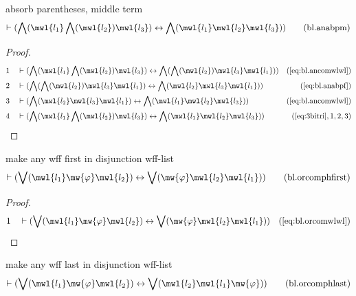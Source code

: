 \begin{lemma} absorb parentheses, middle term
\begin{align}
\vdash ( \bigwedge( \mwl{l_1} \bigwedge( \mwl{l_2} ) \mwl{l_3} )
    \leftrightarrow \bigwedge( \mwl{l_1} \mwl{l_2} \mwl{l_3} )
    )\label{eq:bl.anabpm}\tag{bl.anabpm}
\end{align}
\end{lemma}

\begin{proof}
\begin{align}
  1 &&  & \vdash ( \bigwedge( \mwl{l_1} \bigwedge( \mwl{l_2} ) \mwl{l_3} ) \leftrightarrow \bigwedge( \bigwedge( \mwl{l_2} ) \mwl{l_3} \mwl{l_1} ) )&(\mbox{\ref{eq:bl.ancomwlwl}})\notag
  \\ 2 &&  & \vdash ( \bigwedge( \bigwedge( \mwl{l_2} ) \mwl{l_3} \mwl{l_1} ) \leftrightarrow \bigwedge( \mwl{l_2} \mwl{l_3} \mwl{l_1} ) )&(\mbox{\ref{eq:bl.anabpf}})\notag
  \\ 3 &&  & \vdash ( \bigwedge( \mwl{l_2} \mwl{l_3} \mwl{l_1} ) \leftrightarrow \bigwedge( \mwl{l_1} \mwl{l_2} \mwl{l_3} ) )&(\mbox{\ref{eq:bl.ancomwlwl}})\notag
  \\ 4 &&  & \vdash ( \bigwedge( \mwl{l_1} \bigwedge( \mwl{l_2} ) \mwl{l_3} ) \leftrightarrow \bigwedge( \mwl{l_1} \mwl{l_2} \mwl{l_3} ) )&(\mbox{\ref{eq:3bitri}},1,2,3)\notag
\end{align}
\end{proof}

\begin{lemma} make any wff first in disjunction
wff-list
\begin{align}
\vdash ( \bigvee( \mwl{l_1} \mw{\varphi} \mwl{l_2} ) \leftrightarrow \bigvee(
    \mw{\varphi} \mwl{l_2} \mwl{l_1} )
    )\label{eq:bl.orcomphfirst}\tag{bl.orcomphfirst}
\end{align}
\end{lemma}

\begin{proof}
\begin{align}
  1 &&  & \vdash ( \bigvee( \mwl{l_1} \mw{\varphi} \mwl{l_2} ) \leftrightarrow \bigvee( \mw{\varphi} \mwl{l_2} \mwl{l_1} ) )&(\mbox{\ref{eq:bl.orcomwlwl}})\notag
\end{align}
\end{proof}

\begin{lemma} make any wff last in disjunction
wff-list
\begin{align}
\vdash ( \bigvee( \mwl{l_1} \mw{\varphi} \mwl{l_2} ) \leftrightarrow \bigvee(
    \mwl{l_2} \mwl{l_1} \mw{\varphi} )
    )\label{eq:bl.orcomphlast}\tag{bl.orcomphlast}
\end{align}
\end{lemma}


